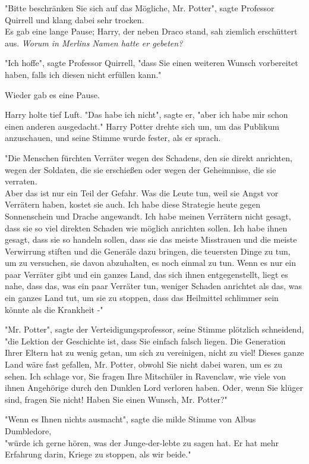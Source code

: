 {"Bitte beschränken Sie sich auf das Mögliche, Mr. Potter", sagte Professor Quirrell und klang dabei sehr trocken.\\ Es gab eine lange Pause; Harry, der neben Draco stand, sah ziemlich erschüttert aus. \emph{Worum in Merlins Namen hatte er gebeten?}

"Ich hoffe", sagte Professor Quirrell, "dass Sie einen weiteren Wunsch vorbereitet haben, falls ich diesen nicht erfüllen kann."

Wieder gab es eine Pause.

Harry holte tief Luft. "Das habe ich nicht", sagte er, "aber ich habe mir schon einen anderen ausgedacht." Harry Potter drehte sich um, um das Publikum anzuschauen, und seine Stimme wurde fester, als er sprach.

"Die Menschen fürchten Verräter wegen des Schadens, den sie direkt anrichten, wegen der Soldaten, die sie erschießen oder wegen der Geheimnisse, die sie verraten.\\ Aber das ist nur ein Teil der Gefahr. Was die Leute tun, weil sie Angst vor Verrätern haben, kostet sie auch. Ich habe diese Strategie heute gegen Sonnenschein und Drache angewandt. Ich habe meinen Verrätern nicht gesagt, dass sie so viel direkten Schaden wie möglich anrichten sollen. Ich habe ihnen gesagt, dass sie so handeln sollen, dass sie das meiste Misstrauen und die meiste Verwirrung stiften und die Generäle dazu bringen, die teuersten Dinge zu tun, um zu versuchen, sie davon abzuhalten, es noch einmal zu tun. Wenn es nur ein paar Verräter gibt und ein ganzes Land, das sich ihnen entgegenstellt, liegt es nahe, dass das, was ein paar Verräter tun, weniger Schaden anrichtet als das, was ein ganzes Land tut, um sie zu stoppen, dass das Heilmittel schlimmer sein könnte als die Krankheit -"

"Mr. Potter", sagte der Verteidigungsprofessor, seine Stimme plötzlich schneidend,\\ "die Lektion der Geschichte ist, dass Sie einfach falsch liegen. Die Generation Ihrer Eltern hat zu wenig getan, um sich zu vereinigen, nicht zu viel! Dieses ganze Land wäre fast gefallen, Mr. Potter, obwohl Sie nicht dabei waren, um es zu sehen. Ich schlage vor, Sie fragen Ihre Mitschüler in Ravenclaw, wie viele von ihnen Angehörige durch den Dunklen Lord verloren haben. Oder, wenn Sie klüger sind, fragen Sie nicht! Haben Sie einen Wunsch, Mr. Potter?"

"Wenn es Ihnen nichts ausmacht", sagte die milde Stimme von Albus Dumbledore,\\ "würde ich gerne hören, was der Junge-der-lebte zu sagen hat. Er hat mehr Erfahrung darin, Kriege zu stoppen, als wir beide."

}
